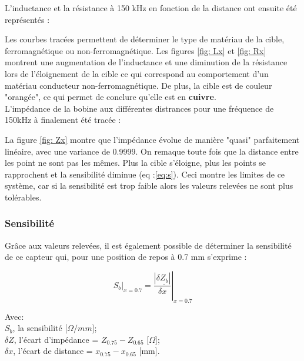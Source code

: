 L'inductance et la résistance à 150 kHz en fonction de la distance ont ensuite été représentés :


Les courbes tracées permettent de déterminer le type de matériau de la cible, ferromagnétique ou 
non-ferromagnétique. Les figures \ref{fig: Lx} et \ref{fig: Rx} montrent une augmentation de 
l'inductance et une diminution de la résistance lors de l'éloignement de la cible ce qui correspond 
au comportement d'un matériau conducteur non-ferromagnétique. 
De plus, la cible est de couleur "orangée", ce qui permet de conclure qu'elle est en \textbf{cuivre}.\\  



L'impédance de la bobine aux différentes distrances pour une fréquence de 150kHz à finalement été tracée :


La figure \ref{fig: Zx} montre que l'impédance évolue de manière "quasi" parfaitement linéaire, avec une 
variance de 0.9999. On remaque toute fois que la distance entre les point ne sont pas les mêmes. 
Plus la cible s'éloigne, plus les points se rapprochent et la sensibilité diminue (eq :\ref{eq:s}).
Ceci montre les limites de ce système, car si la sensibilité est trop faible alors les valeurs relevées
ne sont plus tolérables.
\subsubsection{Sensibilité}

Grâce aux valeurs relevées, il est également possible de déterminer la sensibilité de
ce capteur qui, pour une position de repos à 0.7 mm s'exprime : 

\begin{equation}\label{eq:s}
    \left . S_b \right |_{x=0.7} = \left . \frac{\left | \delta \underline{Z_b}\right |}{\delta x} \right |_{x=0.7}
\end{equation}

Avec: \\
$S_b$, la sensibilité [$\Omega/mm$];\\
$\delta Z$, l'écart d'impédance = $Z_{0.75} - Z_{0.65}$ [$\Omega$];\\
$\delta x$, l'écart de distance  = $x_{0.75} - x_{0.65}$ [mm].



